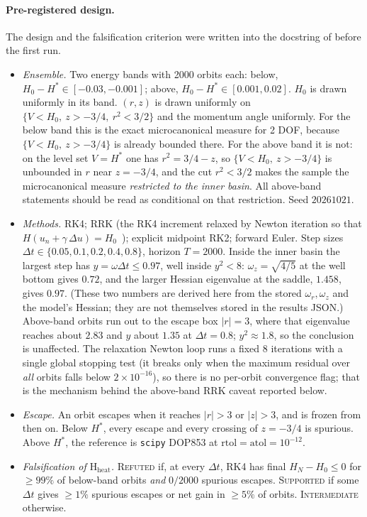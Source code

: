 \documentclass[11pt,a4paper]{article}
\theoremstyle{definition}
\newcommand{\Hs}{H^{*}}
\begin{document}
\paragraph{Pre-registered design.} The design and the falsification criterion were written into the docstring of  before the first run.
\begin{itemize}
  \item \emph{Ensemble.} Two energy bands with 2000 orbits each: below, $H_0-\Hs\in[-0.03,-0.001]$; above, $H_0-\Hs\in[0.001,0.02]$. $H_0$ is drawn uniformly in its band. $(r,z)$ is drawn uniformly on $\{V<H_0,\ z>-3/4,\ r^2<3/2\}$ and the momentum angle uniformly. For the below band this is the exact microcanonical measure for 2 DOF, because $\{V<H_0,\ z>-3/4\}$ is already bounded there. For the above band it is not: on the level set $V=\Hs$ one has $r^2=3/4-z$, so $\{V<H_0,\ z>-3/4\}$ is unbounded in $r$ near $z=-3/4$, and the cut $r^2<3/2$ makes the sample the microcanonical measure \emph{restricted to the inner basin}. All above-band statements should be read as conditional on that restriction. Seed $20261021$.
  \item \emph{Methods.} RK4; RRK (the RK4 increment relaxed by Newton iteration so that $H(u_n+\gamma\,\Delta u)=H_0$~\cite{Ranocha2020}); explicit midpoint RK2; forward Euler. Step sizes $\Delta t\in\{0.05,0.1,0.2,0.4,0.8\}$, horizon $T=2000$. Inside the inner basin the largest step has $y=\omega\Delta t\le0.97$, well inside $y^2<8$: $\omega_z=\sqrt{4/5}$ at the well bottom gives $0.72$, and the larger Hessian eigenvalue at the saddle, $1.458$, gives $0.97$. (These two numbers are derived here from the stored $\omega_r,\omega_z$ and the model's Hessian; they are not themselves stored in the results JSON.) Above-band orbits run out to the escape box $|r|=3$, where that eigenvalue reaches about $2.83$ and $y$ about $1.35$ at $\Delta t=0.8$; $y^2\approx1.8$, so the conclusion is unaffected. The relaxation Newton loop runs a fixed 8 iterations with a single global stopping test (it breaks only when the maximum residual over \emph{all} orbits falls below $2\times10^{-16}$), so there is no per-orbit convergence flag; that is the mechanism behind the above-band RRK caveat reported below.
  \item \emph{Escape.} An orbit escapes when it reaches $|r|>3$ or $|z|>3$, and is frozen from then on. Below $\Hs$, every escape and every crossing of $z=-3/4$ is spurious. Above $\Hs$, the reference is \texttt{scipy} DOP853 at $\mathrm{rtol}=\mathrm{atol}=10^{-12}$.
  \item \emph{Falsification of $\mathrm{H_{heat}}$.} \textsc{Refuted} if, at every $\Delta t$, RK4 has final $H_N-H_0\le0$ for $\ge99\%$ of below-band orbits \emph{and} $0/2000$ spurious escapes. \textsc{Supported} if some $\Delta t$ gives $\ge1\%$ spurious escapes or net gain in $\ge5\%$ of orbits. \textsc{Intermediate} otherwise.
\end{itemize}
\end{document}
